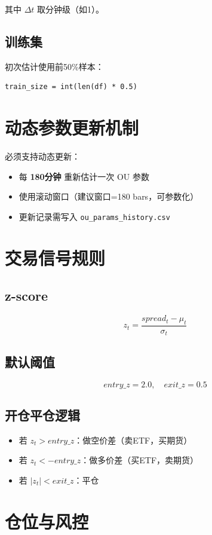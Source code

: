 \documentclass[11pt]{article}
\begin{document}
其中 $\Delta t$ 取分钟级（如1）。

\subsection{训练集}
初次估计使用前50\%样本：
\begin{lstlisting}
train_size = int(len(df) * 0.5)
\end{lstlisting}

\section{动态参数更新机制}
必须支持动态更新：
\begin{itemize}
  \item 每 \textbf{180分钟} 重新估计一次 OU 参数
  \item 使用滚动窗口（建议窗口=180 bars，可参数化）
  \item 更新记录需写入 \texttt{ou\_params\_history.csv}
\end{itemize}

\section{交易信号规则}
\subsection{z-score}
\[
z_t = \frac{spread_t - \mu_t}{\sigma_t}
\]

\subsection{默认阈值}
\[
entry\_z = 2.0,\quad exit\_z = 0.5
\]

\subsection{开仓平仓逻辑}
\begin{itemize}
  \item 若 $z_t > entry\_z$：做空价差（卖ETF，买期货）
  \item 若 $z_t < -entry\_z$：做多价差（买ETF，卖期货）
  \item 若 $|z_t| < exit\_z$：平仓
\end{itemize}

\section{仓位与风控}
\end{document}
